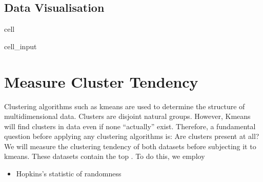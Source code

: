 \documentclass[letterpaper,10pt,english]{jupyterBook}
\begin{document}
\subsection{Data Visualisation}
\label{\detokenize{Clustering_Analysis:data-visualisation}}
\begin{sphinxuseclass}{cell}\begin{sphinxVerbatimInput}

\begin{sphinxuseclass}{cell_input}
\begin{sphinxVerbatim}[commandchars=\\\{\}]
   
 
   
   
\end{sphinxVerbatim}

\end{sphinxuseclass}\end{sphinxVerbatimInput}

\end{sphinxuseclass}

\section{Measure Cluster Tendency}
\label{\detokenize{Clustering_Analysis:measure-cluster-tendency}}
\sphinxAtStartPar
Clustering algorithms such as k\sphinxhyphen{}means are used to determine the structure of multi\sphinxhyphen{}dimensional data. Clusters are disjoint natural groups. However, K\sphinxhyphen{}means will find clusters in data even if none “actually” exist. Therefore, a fundamental question before applying any clustering algorithms is: Are clusters present at all?
We will measure the clustering tendency of both datasets before subjecting it to k\sphinxhyphen{}means. These datasets contain the top . To do this, we employ
\begin{itemize}
\item {} 
\sphinxAtStartPar
Hopkins’s statistic  of randomness

\end{itemize}
\end{document}
